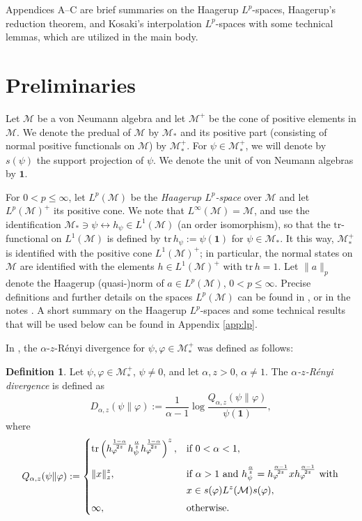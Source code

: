 \documentclass[12pt]{article}
\theoremstyle{definition}
\newtheorem{defi}[theorem]{Definition}
\theoremstyle{remark}
\numberwithin{equation}{section}
\def\Me{\mathcal M}
\def\Tr{\mathrm{tr}}
\def\1{\mathbf{1}}
\begin{document}
{Appendices A--C are brief summaries on the Haagerup $L^p$-spaces, Haagerup's reduction theorem,
and Kosaki's interpolation $L^p$-spaces with some technical lemmas, which are utilized in the main body.}


\section{Preliminaries}


Let $\Me$ be a von Neumann algebra and let $\Me^+$ be the cone of positive elements in $\Me$. We
denote the predual of $\Me$ by $\Me_*$ and its positive part (consisting of normal positive
functionals on $\Me$) by $\Me_*^+$. For $\psi\in \Me_*^+$, we will denote by $s(\psi)$ the support
projection  of $\psi$. We denote the unit of von Neumann algebras by $\1$.

For $0< p\le \infty$, let $L^p(\Me)$ be the \emph{Haagerup $L^p$-space}
\cite{haagerup1979lpspaces,terp1981lpspaces} over $\Me$ and let $L^p(\Me)^+$ its positive cone. We
{note that $L^\infty(\Me)=\Me$, and use the identification
$\Me_*\ni \psi \leftrightarrow h_\psi\in L^1(\Me)$ (an order isomorphism)},
so that the $\Tr$-functional on $L^1(\Me)$ is defined by $\Tr\,h_\psi:=\psi(\1)$ for $\psi\in \Me_*$. It this way,
$\Me_*^+$ is identified with the positive cone $L^1(\Me)^+$; in particular, the normal states
on $\Me$ are identified with the elements $h\in L^1(\Me)^+$ with $\Tr\,h=1$. Let $\|a\|_p$ denote the
Haagerup (quasi-)norm of $a\in L^p(\Me)$, $0<p\le\infty$. Precise definitions and further details on
the spaces $L^p(\Me)$ can be found in \cite[Chap.~9]{hiai2021lectures}, or in the notes
\cite{terp1981lpspaces}. A short summary on the Haagerup $L^p$-spaces and some technical results
that will be used below can be found in Appendix \ref{app:lp}.


In \cite{kato2023aremark, kato2023onrenyi}, the
$\alpha$-$z$-R\'enyi divergence for $\psi,\varphi\in \mathcal M_*^+$  was defined as follows:

\begin{defi}\label{defi:renyi} Let $\psi,\varphi\in \Me_*^+$, $\psi\ne 0$, and let
$\alpha,z>0$, $\alpha\ne 1$. The \emph{$\alpha$-$z$-R\'enyi divergence} is defined as 
\[
D_{\alpha,z}(\psi\|\varphi):=\frac1{\alpha-1}\log
\frac{Q_{\alpha,z}(\psi\|\varphi)}{\psi(\1)},
\]
where
\[
Q_{\alpha,z}(\psi\|\varphi):=\begin{dcases} \Tr
\left(h_\varphi^{\frac{1-\alpha}{2z}}h_\psi^{\frac{\alpha}{z}}h_\varphi^{\frac{1-\alpha}{2z}}\right)^z, &
\text{if } 0<\alpha<1,\\[0.3em]
\|x\|_z^z, & \text{if } \alpha>1 \text{ and }
h_\psi^{\frac{\alpha}{z}}=h_\varphi^{\frac{\alpha-1}{2z}}xh_\varphi^{\frac{\alpha-1}{2z}}
\ \text{with}\\ & x\in s(\varphi)L^z(\Me)s(\varphi),\\[0.3em]
\infty,& \text{otherwise}.
\end{dcases}
\]
\end{defi}
\end{document}
